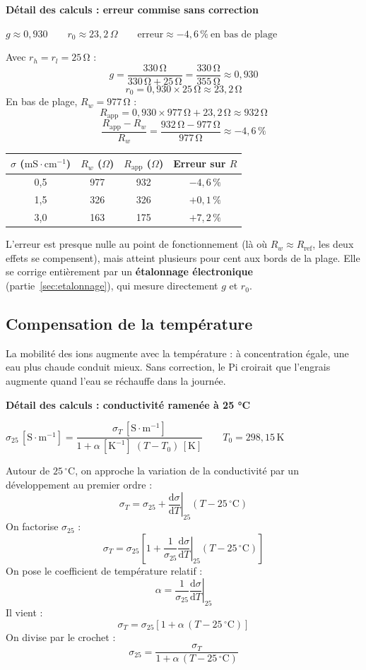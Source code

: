 \documentclass[11pt,a4paper]{article}
\newcommand{\resultat}[1]{\begin{center}{\large\color{bleuENO}$\displaystyle #1$}\end{center}}
\newenvironment{demo}[2]{\par\medskip\noindent\textbf{Détail des calculs : #1}\par\nopagebreak\resultat{#2}}{\par\medskip}
\newcommand{\calcul}[2]{\par\medskip\noindent\textbf{Détail des calculs : #1}\par\nopagebreak\resultat{#2}}
\newcommand{\ligne}{\arrayrulecolor{ligneENO}\specialrule{0.4pt}{0pt}{0pt}\arrayrulecolor{black}}
\newcommand{\U}[1]{\,\mathrm{#1}}
\begin{document}
\calcul{erreur commise sans correction}{g \approx 0{,}930 \qquad r_0 \approx 23{,}2\,\Omega \qquad \text{erreur} \approx -4{,}6\,\% \ \text{en bas de plage}}
Avec $r_h = r_l = 25\U{\Omega}$ :
\[
g = \frac{330\U{\Omega}}{330\U{\Omega} + 25\U{\Omega}} = \frac{330\U{\Omega}}{355\U{\Omega}} \approx 0{,}930
\]
\[
r_0 = 0{,}930 \times 25\U{\Omega} \approx 23{,}2\U{\Omega}
\]
En bas de plage, $R_w = 977\U{\Omega}$ :
\[
R_{\text{app}} = 0{,}930 \times 977\U{\Omega} + 23{,}2\U{\Omega} \approx 932\U{\Omega}
\]
\[
\frac{R_{\text{app}} - R_w}{R_w} = \frac{932\U{\Omega} - 977\U{\Omega}}{977\U{\Omega}} \approx -4{,}6\U{\%}
\]

\begin{center}
\begin{tabular}{c c c c}
\toprule
\textbf{$\sigma$ ($\mathrm{mS \cdot cm^{-1}}$)} & \textbf{$R_w$ ($\Omega$)} & \textbf{$R_{\text{app}}$ ($\Omega$)} & \textbf{Erreur sur $R$} \\
\midrule
0,5 & 977 & 932 & $-4{,}6\U{\%}$ \\ \ligne
1,5 & 326 & 326 & $+0{,}1\U{\%}$ \\ \ligne
3,0 & 163 & 175 & $+7{,}2\U{\%}$ \\
\bottomrule
\end{tabular}
\end{center}

L'erreur est presque nulle au point de fonctionnement (là où $R_w \approx R_{\text{ref}}$, les deux effets se compensent), mais atteint plusieurs pour cent aux bords de la plage. Elle se corrige entièrement par un \textbf{étalonnage électronique} (partie~\ref{sec:etalonnage}), qui mesure directement $g$ et $r_0$.

\subsection{Compensation de la température}

La mobilité des ions augmente avec la température : à concentration égale, une eau plus chaude conduit mieux. Sans correction, le Pi croirait que l'engrais augmente quand l'eau se réchauffe dans la journée.

\begin{demo}{conductivité ramenée à 25 °C}{\sigma_{25}\,[\mathrm{S \cdot m^{-1}}] = \dfrac{\sigma_T\,[\mathrm{S \cdot m^{-1}}]}{1 + \alpha\,[\mathrm{K^{-1}}] \; (T - T_0)\,[\mathrm{K}]} \qquad T_0 = 298{,}15\,\mathrm{K}}
Autour de $25\U{{}^{\circ}C}$, on approche la variation de la conductivité par un développement au premier ordre :
\[
\sigma_T = \sigma_{25} + \left. \frac{\mathrm{d}\sigma}{\mathrm{d}T} \right|_{25} (T - 25\U{{}^{\circ}C})
\]
On factorise $\sigma_{25}$ :
\[
\sigma_T = \sigma_{25} \left[ 1 + \frac{1}{\sigma_{25}} \left. \frac{\mathrm{d}\sigma}{\mathrm{d}T} \right|_{25} (T - 25\U{{}^{\circ}C}) \right]
\]
On pose le coefficient de température relatif :
\[
\alpha = \frac{1}{\sigma_{25}} \left. \frac{\mathrm{d}\sigma}{\mathrm{d}T} \right|_{25}
\]
Il vient :
\[
\sigma_T = \sigma_{25} \left[ 1 + \alpha \, (T - 25\U{{}^{\circ}C}) \right]
\]
On divise par le crochet :
\[
\sigma_{25} = \frac{\sigma_T}{1 + \alpha \, (T - 25\U{{}^{\circ}C})}
\]
\end{demo}
\end{document}
